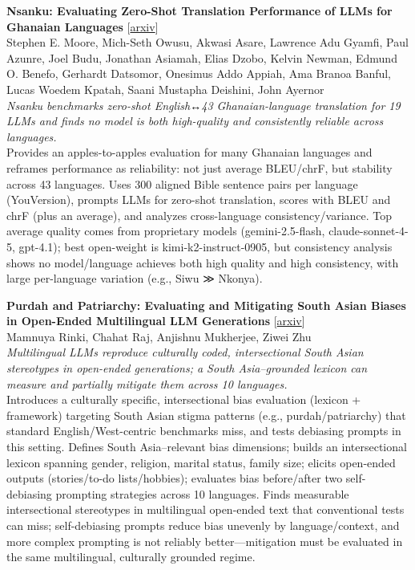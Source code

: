 \documentclass[12pt,letterpaper]{article}
\begin{document}
\medskip

{\small\textbf{Nsanku: Evaluating Zero-Shot Translation Performance of LLMs for Ghanaian Languages}} {\scriptsize[\href{https://arxiv.org/abs/2605.04208}{arxiv}]}\\
{\scriptsize Stephen E. Moore, Mich-Seth Owusu, Akwasi Asare, Lawrence Adu Gyamfi, Paul Azunre, Joel Budu, Jonathan Asiamah, Elias Dzobo, Kelvin Newman, Edmund O. Benefo, Gerhardt Datsomor, Onesimus Addo Appiah, Ama Branoa Banful, Lucas Woedem Kpatah, Saani Mustapha Deishini, John Ayernor}\\

{\small\textit{Nsanku benchmarks zero-shot English↔43 Ghanaian-language translation for 19 LLMs and finds no model is both high-quality and consistently reliable across languages.}}\\[1pt]
{\footnotesize Provides an apples-to-apples evaluation for many Ghanaian languages and reframes performance as reliability: not just average BLEU/chrF, but stability across 43 languages. Uses 300 aligned Bible sentence pairs per language (YouVersion), prompts LLMs for zero-shot translation, scores with BLEU and chrF (plus an average), and analyzes cross-language consistency/variance. Top average quality comes from proprietary models (gemini-2.5-flash, claude-sonnet-4-5, gpt-4.1); best open-weight is kimi-k2-instruct-0905, but consistency analysis shows no model/language achieves both high quality and high consistency, with large per-language variation (e.g., Siwu ≫ Nkonya).}

\medskip

{\small\textbf{Purdah and Patriarchy: Evaluating and Mitigating South Asian Biases in Open-Ended Multilingual LLM Generations}} {\scriptsize[\href{https://arxiv.org/abs/2505.18466}{arxiv}]}\\
{\scriptsize Mamnuya Rinki, Chahat Raj, Anjishnu Mukherjee, Ziwei Zhu}\\

{\small\textit{Multilingual LLMs reproduce culturally coded, intersectional South Asian stereotypes in open-ended generations; a South Asia--grounded lexicon can measure and partially mitigate them across 10 languages.}}\\[1pt]
{\footnotesize Introduces a culturally specific, intersectional bias evaluation (lexicon + framework) targeting South Asian stigma patterns (e.g., purdah/patriarchy) that standard English/West-centric benchmarks miss, and tests debiasing prompts in this setting. Defines South Asia--relevant bias dimensions; builds an intersectional lexicon spanning gender, religion, marital status, family size; elicits open-ended outputs (stories/to-do lists/hobbies); evaluates bias before/after two self-debiasing prompting strategies across 10 languages. Finds measurable intersectional stereotypes in multilingual open-ended text that conventional tests can miss; self-debiasing prompts reduce bias unevenly by language/context, and more complex prompting is not reliably better---mitigation must be evaluated in the same multilingual, culturally grounded regime.}
\end{document}
